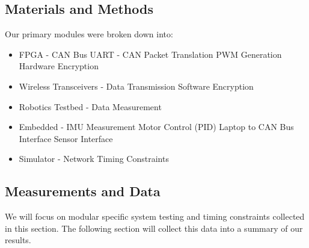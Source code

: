 \documentclass[a0,landscape]{a0poster}
\begin{document}
\begin{multicols}{4}

\section*{Materials and Methods}

Our primary modules were broken down into: 

\begin{itemize}
\item FPGA -
\subitem CAN Bus
\subitem UART - CAN Packet Translation
\subitem PWM Generation
\subitem Hardware Encryption
\item Wireless Transceivers -
\subitem Data Transmission
\subitem Software Encryption
\item Robotics Testbed -
\subitem Data Measurement
\item Embedded -
\subitem IMU Measurement
\subitem Motor Control (PID)
\subitem Laptop to CAN Bus Interface
\subitem Sensor Interface
\item Simulator -
\subitem Network Timing Constraints
\end{itemize}
	
\subsection*{Measurements and Data}

We will focus on modular specific system testing and timing constraints collected in this section. The following section will collect this data into a summary of our results.


\end{multicols}
\end{document}
